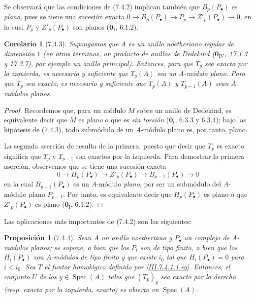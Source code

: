 \documentclass[10pt,oneside,openany]{book}
\theoremstyle{egaenv}\newtheorem*{env}{---}
\theoremstyle{egastatement}
\newtheorem*{proposition}{Proposición}
\newtheorem*{corollary}{Corolario}
\theoremstyle{egadescription}
\begin{document}
Se observará que las condiciones de (7.4.2) implican también que
$B_p(P_\bullet)$ es \emph{plano}, pues se tiene una sucesión exacta
$0\longrightarrow B_p(P_\bullet)\longrightarrow P_p
\longrightarrow Z'_p(P_\bullet)\longrightarrow0$,
en la cual $P_p$ y $Z'_p(P_\bullet)$ son planos ($\mathbf{0}_{\mathrm I}$, 6.1.2).

\begin{corollary}[7.4.3]
\label{III.7.4.3}
Supongamos que $A$ es un anillo noetheriano regular de dimensión $1$
\textup{(en otros términos, un \emph{producto de anillos de Dedekind}
($\mathbf{0}_{\mathrm{IV}}$, 17.1.3 y 17.3.7), por ejemplo un anillo \emph{principal})}. Entonces,
para que $T_p$ sea exacto por la izquierda, es necesario y suficiente que
$T_p(A)$ sea un $A$-módulo plano. Para que $T_p$ sea exacto, es necesario y
suficiente que $T_p(A)$ y $T_{p-1}(A)$ sean $A$-módulos planos.
\end{corollary}

\begin{proof}
Recordemos que, para un módulo $M$ sobre un anillo de Dedekind, es equivalente
decir que $M$ es \emph{plano} o que es \emph{sin torsión} ($\mathbf{0}_{\mathrm I}$, 6.3.3 y
6.3.4); bajo las hipótesis de (7.4.3), todo submódulo de un $A$-módulo plano es, por tanto, plano.

La segunda aserción de  resulta de la primera, puesto que decir
que $T_p$ es exacto significa que $T_p$ y $T_{p-1}$ son exactos por la
izquierda. Para demostrar la primera aserción, observemos que se tiene una
sucesión exacta
\[
  0\longrightarrow H_p(P_\bullet)\longrightarrow Z'_p(P_\bullet)
  \longrightarrow B_{p-1}(P_\bullet)\longrightarrow0
\]
en la cual $B_{p-1}(P_\bullet)$ es un $A$-módulo \emph{plano}, por ser un submódulo
del $A$-módulo plano $P_{p-1}$. Por tanto, es equivalente decir que
$H_p(P_\bullet)$ es plano o que $Z'_p(P_\bullet)$ es plano
($\mathbf{0}_{\mathrm I}$, 6.1.2).
\end{proof}

Las aplicaciones más importantes de (7.4.2) son las siguientes:

\begin{proposition}[7.4.4]
\label{III.7.4.4}
Sean $A$ un anillo noetheriano y $P_\bullet$ un complejo de $A$-módulos
planos; se supone, o bien que los $P_i$ son de tipo finito, o bien que los
$H_i(P_\bullet)$ son $A$-módulos de tipo finito y que existe $i_0$ tal que
$H_i(P_\bullet)=0$ para $i<i_0$. Sea $T$ el funtor homológico definido por
\eqref{III.7.4.1.1.eq}. Entonces, el conjunto $U$ de los
$y\in\operatorname{Spec}(A)$ tales que $(T_p)_y$  sea exacto por la derecha
\textup{(resp. \emph{exacto por la izquierda, exacto})} es abierto en $\operatorname{Spec}(A)$.
\end{proposition}
\end{document}
